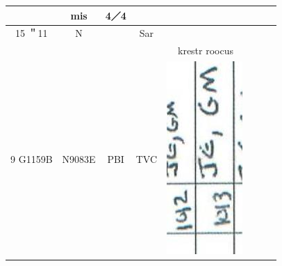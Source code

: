 \documentclass[10pt]{article}
\begin{document}
\begin{center}
\begin{tabular}{|c|c|c|c|c|c|c|c|c|c|}
 & mis & 4／4 &  &  \\
\hline
15 ＂11 & N &  & Sar &  &  &  &  &  &  \\
\hline
 &  &  &  &  & \multicolumn{2}{|l|}{krestr roocus} &  &  &  \\
\hline
9 G1159B & N9083E & PBI & TVC & \multicolumn{3}{|l|}{\multirow[t]{2}{*}{\includegraphics[max width=\textwidth]{2025_02_27_dd68c3d38de88f0516d9g-053(6)}
}}
\end{tabular}
\end{center}
\end{document}
